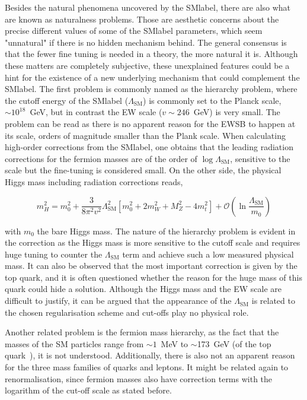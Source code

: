 Besides the natural phenomena uncovered by the \acrshort{SMlabel}, there are also what are known as naturalness problems. Those are aesthetic concerns about the precise different values of some of the \acrshort{SMlabel} parameters, which seem "unnatural" if there is no hidden mechanism behind. The general consensus is that the fewer fine tuning is needed in a theory, the more natural it is. Although these matters are completely subjective, these unexplained features could be a hint for the existence of a new underlying mechanism that could complement the \acrshort{SMlabel}. The first problem is commonly named as the hierarchy problem, where the cutoff energy of the \acrshort{SMlabel} ($\Lambda_{\text{SM}}$) is commonly set to the Planck scale, $\sim10^{18}$~GeV, but in contrast the \acrshort{EW} scale ($v\sim246$~GeV) is very small. The problem can be read as there is no apparent reason for the \acrshort{EWSB} to happen at its scale, orders of magnitude smaller than the Plank scale. When calculating high-order corrections from the \acrshort{SMlabel}, one obtains that the leading radiation corrections for the fermion masses are of the order of $\log\Lambda_{\text{SM}}$, sensitive to the scale but the fine-tuning is considered small. On the other side, the physical Higgs mass including radiation corrections reads,

\begin{equation}
    m^2_H = m_0^2 + \frac{3}{8\pi^2v^2}\Lambda_{\text{SM}}^2 [ m_0^2 + 2m_W^2 + M_Z^2 - 4m_t^2] + \mathcal{O}(\ln\frac{\Lambda_{\text{SM}}}{m_0})
\end{equation}

with $m_0$ the bare Higgs mass. The nature of the hierarchy problem is evident in the correction as the Higgs mass is more sensitive to the cutoff scale and requires huge tuning to counter the $\Lambda_{\text{SM}}$ term and achieve such a low measured physical mass. It can also be observed that the most important correction is given by the top quark, and it is often questioned whether the reason for the huge mass of this quark could hide a solution. Although the Higgs mass and the \acrshort{EW} scale are difficult to justify, it can be argued that the appearance of the $\Lambda_{\text{SM}}$ is related to the chosen regularisation scheme and cut-offs play no physical role. 

Another related problem is the fermion mass hierarchy, as the fact that the masses of the SM particles range from $\sim1$~MeV to $\sim$173~GeV (of the top quark~\cite{pdg}), it is not understood. Additionally, there is also not an apparent reason for the three mass families of quarks and leptons. It might be related again to renormalisation, since fermion masses also have correction terms with the logarithm of the cut-off scale as stated before.\\

